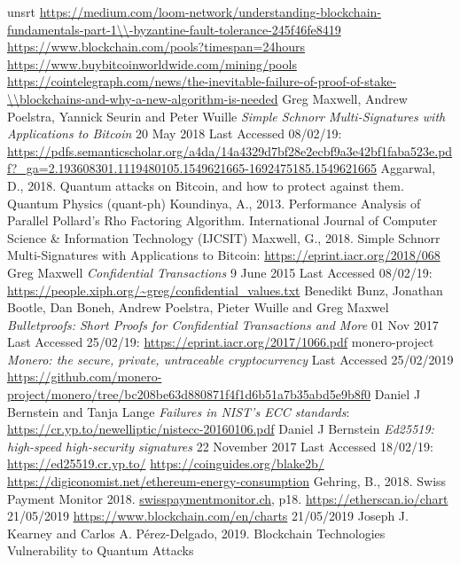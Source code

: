 \documentclass[a4paper, 12pt]{book}
\begin{document}
\begin{thebibliography} {unsrt}
 \url{https://medium.com/loom-network/understanding-blockchain-fundamentals-part-1\\-byzantine-fault-tolerance-245f46fe8419}
 \url{https://www.blockchain.com/pools?timespan=24hours} 
 \url{https://www.buybitcoinworldwide.com/mining/pools}
 \url{https://cointelegraph.com/news/the-inevitable-failure-of-proof-of-stake-\\blockchains-and-why-a-new-algorithm-is-needed}
 Greg Maxwell, Andrew Poelstra, Yannick Seurin and Peter Wuille {\em Simple Schnorr Multi-Signatures with Applications to Bitcoin} 20 May 2018 Last Accessed 08/02/19: \url{https://pdfs.semanticscholar.org/a4da/14a4329d7bf28e2ecbf9a3e42bf1faba523e.pdf?_ga=2.193608301.1119480105.1549621665-1692475185.1549621665} 
 Aggarwal, D., 2018. Quantum attacks on Bitcoin, and how to protect against them. Quantum Physics (quant-ph)
 Koundinya, A., 2013. Performance Analysis of Parallel Pollard's Rho Factoring Algorithm. International Journal of Computer Science \& Information Technology (IJCSIT)
 Maxwell, G., 2018. Simple Schnorr Multi-Signatures with Applications to Bitcoin: \url{https://eprint.iacr.org/2018/068}
 Greg Maxwell {\em Confidential Transactions} 9 June 2015 Last Accessed 08/02/19: \url{https://people.xiph.org/~greg/confidential_values.txt}
 Benedikt Bunz, Jonathan Bootle, Dan Boneh, Andrew Poelstra, Pieter Wuille and Greg Maxwel {\em Bulletproofs:  Short Proofs for Confidential Transactions and More} 01 Nov 2017 Last Accessed 25/02/19: \url{https://eprint.iacr.org/2017/1066.pdf}
 monero-project {\em Monero: the secure, private, untraceable cryptocurrency} Last Accessed 25/02/2019 \url{https://github.com/monero-project/monero/tree/bc208be63d880871f4f1d6b51a7b35abd5e9b8f0}
 Daniel J Bernstein and Tanja Lange  {\em Failures in NIST's ECC standards}: \url{https://cr.yp.to/newelliptic/nistecc-20160106.pdf}
 Daniel J Bernstein {\em Ed25519: high-speed high-security signatures} 22 November 2017 Last Accessed 18/02/19: \url{https://ed25519.cr.yp.to/}
 \url{https://coinguides.org/blake2b/}
 \url{https://digiconomist.net/ethereum-energy-consumption}
 Gehring, B., 2018. Swiss Payment Monitor 2018. \url{swisspaymentmonitor.ch}, p18.
 \url{https://etherscan.io/chart} 21/05/2019
 \url{https://www.blockchain.com/en/charts} 21/05/2019
 Joseph J. Kearney and Carlos A. P\'erez-Delgado, 2019. Blockchain Technologies Vulnerability to Quantum Attacks

\end{thebibliography}
\end{document}
